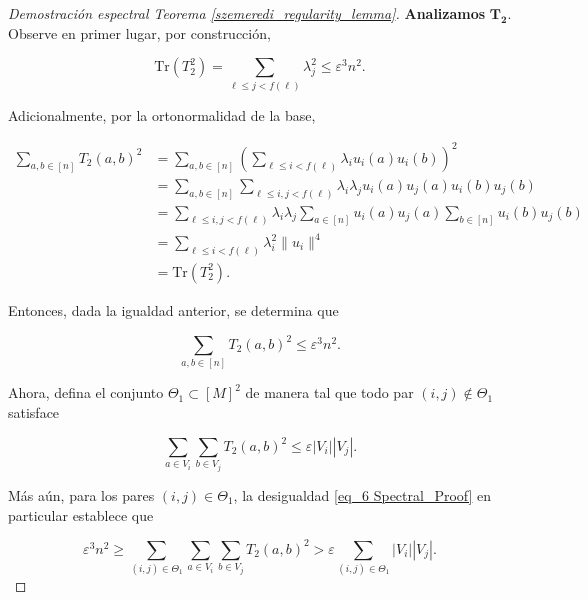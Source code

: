\documentclass{article}[14pts]
\providecommand{\norm}[1]{\lVert#1\rVert}
\newcommand{\Tr}{\mathrm{Tr}}
\providecommand{\norm}[1]{\lVert#1\rVert}
\let\varepsilon=\varepsilon
\begin{document}
\begin{proof}[Demostración espectral Teorema \ref{szemeredi_regularity_lemma}]
    \textbf{Analizamos} $\mathbf{T_2}$. Observe en primer lugar, por construcción,\medskip

    \begin{equation*}
        \Tr (T_{2}^{2}) = \sum_{\ell \leq j < f(\ell)} \lambda_{j}^{2} \leq \varepsilon^{3}n^{2}.
    \end{equation*}\medskip

    Adicionalmente, por la ortonormalidad de la base,\medskip

    \begin{align*}
        \sum_{a,b\in [n]} T_2 (a,b)^{2} &= \sum_{a,b\in [n]} \left( \sum_{\ell \leq i < f(\ell)} \lambda_i u_i(a) u_i(b)\right)^{2}\\
        &= \sum_{a,b\in [n]} \sum_{\ell \leq i,j < f(\ell)} \lambda_i \lambda_j u_i(a) u_j(a) u_i(b) u_j(b)\\
        &= \sum_{\ell \leq i,j < f(\ell)} \lambda_i \lambda_j \sum_{a\in [n]} u_i(a) u_j(a) \sum_{b\in [n]} u_i(b) u_j(b)\\
        &= \sum_{\ell \leq i < f(\ell)} \lambda_{i}^{2} \norm{u_i}^{4}\\
        &= \Tr (T_{2}^{2}).
    \end{align*}\medskip

    Entonces, dada la igualdad anterior, se determina que\medskip

    \begin{equation} \label{eq_6 Spectral_Proof}
        \sum_{a,b\in [n]} T_{2}(a,b)^{2} \leq \varepsilon^{3}n^{2}.
    \end{equation}\medskip

    Ahora, defina el conjunto $\Theta_1 \subset [M]^{2}$ de manera tal que todo par $(i,j)\not\in \Theta_1$ satisface\medskip

    \begin{equation} \label{eq_7 Spectral_Proof}
        \sum_{a\in V_i} \sum_{b\in V_j} T_{2}(a,b)^{2} \leq \varepsilon |V_i| |V_j|.
    \end{equation}\medskip

    Más aún, para los pares $(i,j)\in \Theta_1$, la desigualdad \eqref{eq_6 Spectral_Proof} en particular establece que\medskip

    \begin{equation*}
        \varepsilon^{3} n^{2} \geq \sum_{(i,j)\in \Theta_1} \sum_{a\in V_i} \sum_{b\in V_j} T_{2}(a,b)^{2} > \varepsilon \sum_{(i,j)\in \Theta_1} |V_i| |V_j|.
    \end{equation*}\medskip


\end{proof}
\end{document}
